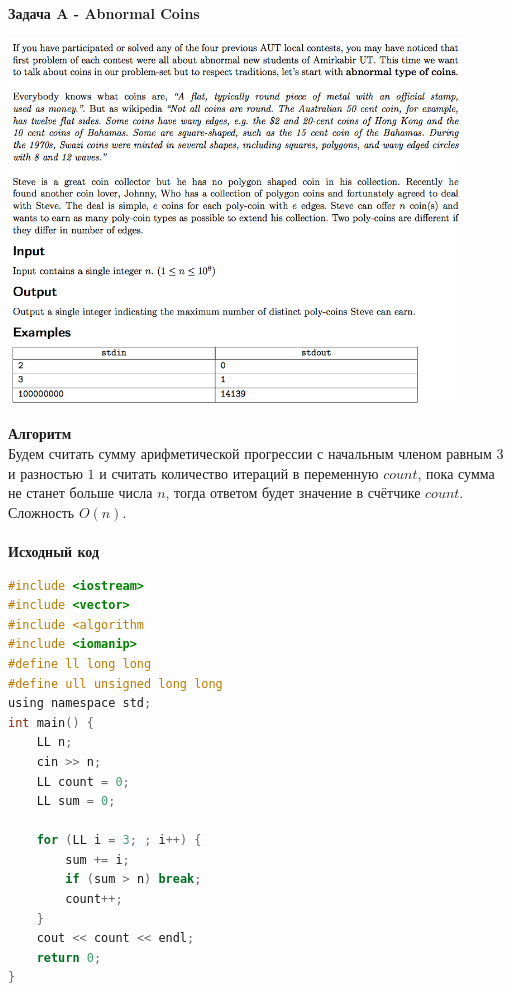 \documentclass[a4paper,12pt]{article}
\begin{document}
\textbf{{\large Задача A - Abnormal Coins}} \\
\begin{center}
\includegraphics[width=0.9\textwidth]{CT_S02E10/CT_S02E10_A.png}\\ [1cm]
\end{center}
\textbf{{\large Алгоритм}} \\
Будем считать сумму арифметической прогрессии с начальным членом равным $3$ и разностью $1$ и считать количество итераций в переменную $count$, пока сумма не станет больше числа $n$, тогда ответом будет значение в счётчике $count$. Сложность $O(n)$.  \\ 
\\
\textbf{{\large Исходный код}}
\begin{lstlisting}[language=C]
#include <iostream>
#include <vector>
#include <algorithm
#include <iomanip>
#define ll long long
#define ull unsigned long long
using namespace std;
int main() {
    LL n;
    cin >> n;
    LL count = 0;
    LL sum = 0;
    
    for (LL i = 3; ; i++) {
        sum += i;
        if (sum > n) break;
        count++;
    }
    cout << count << endl;
    return 0;
}
\end{lstlisting}
\end{document}
